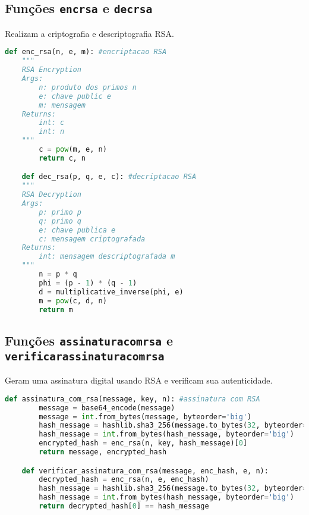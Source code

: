 \documentclass{article}
\begin{document}
\subsection{Funções \texttt{enc\textunderscore rsa} e \texttt{dec\textunderscore rsa}}
Realizam a criptografia e descriptografia RSA.

\begin{lstlisting}[language=Python]
    def enc_rsa(n, e, m): #encriptacao RSA
    """
    RSA Encryption
    Args:
        n: produto dos primos n
        e: chave public e
        m: mensagem
    Returns:
        int: c
        int: n
    """
        c = pow(m, e, n)
        return c, n

    def dec_rsa(p, q, e, c): #decriptacao RSA
    """
    RSA Decryption
    Args:
        p: primo p
        q: primo q
        e: chave publica e
        c: mensagem criptografada
    Returns:
        int: mensagem descriptografada m
    """
        n = p * q
        phi = (p - 1) * (q - 1)
        d = multiplicative_inverse(phi, e)
        m = pow(c, d, n)
        return m
    \end{lstlisting}

\subsection{Funções \texttt{assinatura\textunderscore com\textunderscore rsa} e \texttt{verificar\textunderscore assinatura\textunderscore com\textunderscore rsa}}
Geram uma assinatura digital usando RSA e verificam sua autenticidade.

\begin{lstlisting}[language=Python]
    def assinatura_com_rsa(message, key, n): #assinatura com RSA
        message = base64_encode(message)
        message = int.from_bytes(message, byteorder='big')
        hash_message = hashlib.sha3_256(message.to_bytes(32, byteorder='big')).digest()
        hash_message = int.from_bytes(hash_message, byteorder='big')
        encrypted_hash = enc_rsa(n, key, hash_message)[0]
        return message, encrypted_hash

    def verificar_assinatura_com_rsa(message, enc_hash, e, n):
        decrypted_hash = enc_rsa(n, e, enc_hash)
        hash_message = hashlib.sha3_256(message.to_bytes(32, byteorder='big')).digest()
        hash_message = int.from_bytes(hash_message, byteorder='big')
        return decrypted_hash[0] == hash_message
    \end{lstlisting}
\end{document}
